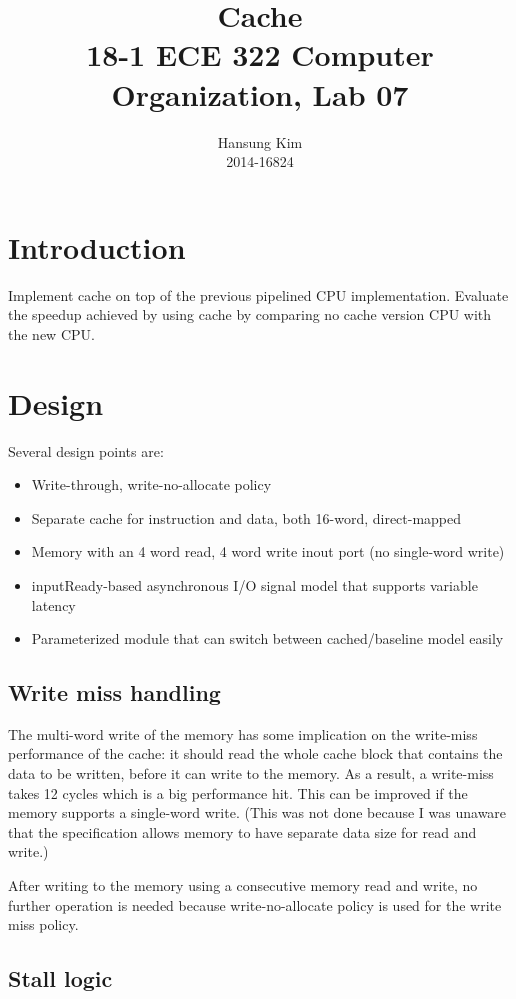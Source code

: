 \documentclass[12pt]{article}
\title{Cache \\
\large 18-1 ECE 322 Computer Organization, Lab 07}
\author{Hansung Kim \\ 2014-16824}
\date{}
\begin{document}
\maketitle

\section{Introduction}
Implement cache on top of the previous pipelined CPU implementation.
Evaluate the speedup achieved by using cache by comparing no cache
version CPU with the new CPU.

\section{Design}
Several design points are:

\begin{itemize}
\item Write-through, write-no-allocate policy
\item Separate cache for instruction and data, both 16-word,
  direct-mapped
\item Memory with an 4 word read, 4 word write inout port (no
  single-word write)
\item inputReady-based asynchronous I/O signal model that supports
  variable latency
\item Parameterized module that can switch between cached/baseline
  model easily
\end{itemize}

\subsection{Write miss handling}

The multi-word write of the memory has some implication on the
write-miss performance of the cache: it should read the whole cache
block that contains the data to be written, before it can write to the
memory.  As a result, a write-miss takes 12 cycles which is a big
performance hit.  This can be improved if the memory supports a
single-word write.  (This was not done because I was unaware that the
specification allows memory to have separate data size for read and
write.)

After writing to the memory using a consecutive memory read and write,
no further operation is needed because write-no-allocate policy is
used for the write miss policy.

\subsection{Stall logic} \label{sec:stall-logic}
\end{document}
